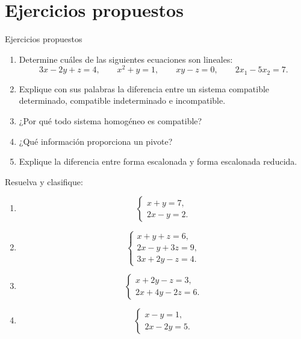 \documentclass[aspectratio=169,9pt]{beamer}
\theoremstyle{remark}
\begin{document}
\section{Ejercicios propuestos}
\begin{frame}[allowframebreaks,t]{Ejercicios propuestos}
\par{}\par\smallskip
\begin{enumerate}
\item Determine cuáles de las siguientes ecuaciones son lineales:
\[
3x-2y+z=4,\qquad x^2+y=1,\qquad xy-z=0,\qquad 2x_1-5x_2=7.
\]
\item Explique con sus palabras la diferencia entre un sistema compatible determinado, compatible
indeterminado e incompatible.
\item ¿Por qué todo sistema homogéneo es compatible?
\item ¿Qué información proporciona un pivote?
\item Explique la diferencia entre forma escalonada y forma escalonada reducida.
\end{enumerate}

\par{}\par\smallskip
Resuelva y clasifique:
\begin{enumerate}
\item
\[
\begin{cases}
x+y=7,\\
2x-y=2.
\end{cases}
\]
\item
\[
\begin{cases}
x+y+z=6,\\
2x-y+3z=9,\\
3x+2y-z=4.
\end{cases}
\]
\item
\[
\begin{cases}
x+2y-z=3,\\
2x+4y-2z=6.
\end{cases}
\]
\item
\[
\begin{cases}
x-y=1,\\
2x-2y=5.
\end{cases}
\]
\end{enumerate}


\end{frame}
\end{document}
